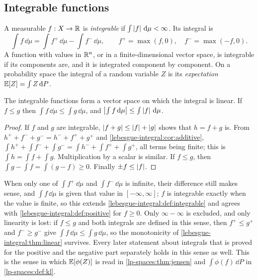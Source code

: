 \begin{notechapter}
\section{Integrable functions}\label{lebesgue-integral:sec:integrable}

\begin{definition}\label{lebesgue-integral:def:integrable}
A measurable $f:X\to\mathbb{R}$ is \emph{integrable} if
$\int\left|f\right|\,\mathrm{d}\mu < \infty$. Its integral is
\[
  \int f\,\dd\mu = \int f^+\,\dd\mu - \int f^-\,\dd\mu , \qquad
  f^+ = \max(f, 0),\quad f^- = \max(-f, 0) .
\]
A function with values in $\mathbb{R}^n$, or in a finite-dimensional vector
space, is integrable if its components are, and it is integrated
component by component. On a probability space the integral of a random
variable $Z$ is its \emph{expectation} $\mathbb{E}[Z] = \int Z\,\mathrm{d} P$.
\end{definition}

\begin{theorem}\label{lebesgue-integral:thm:linear}
The integrable functions form a vector space on which the integral is
linear. If $f\leq g$ then $\int f\,\dd\mu\leq\int g\,\dd\mu$, and
$\left|\int f\,\mathrm{d}\mu\right|\leq\int\left|f\right|\,\mathrm{d}\mu$.
\end{theorem}

\begin{proof}
If $f$ and $g$ are integrable, $\left|f + g\right|\leq\left|f\right| + \left|g\right|$ shows
that $h = f + g$ is. From
$h^+ + f^- + g^- = h^- + f^+ + g^+$ and
\cref{lebesgue-integral:cor:additive},
$\int h^+ + \int f^- + \int g^- = \int h^- + \int f^+ + \int g^+$, all
terms being finite; this is $\int h = \int f + \int g$. Multiplication
by a scalar is similar. If $f\leq g$, then
$\int g - \int f = \int(g - f)\geq0$. Finally
$\pm f\leq\left|f\right|$.
\end{proof}

\begin{remark}
\label{lebesgue-integral:rem:extended}
When only one of $\int f^+\,\dd\mu$ and $\int f^-\,\dd\mu$ is
infinite, their difference still makes sense, and
$\int f\,\dd\mu$ is given that value in $[-\infty, \infty]$; $f$ is
integrable exactly when the value is finite, so this extends
\cref{lebesgue-integral:def:integrable} and agrees with
\cref{lebesgue-integral:def:positive} for $f\geq0$. Only
$\infty - \infty$ is excluded, and only linearity is lost: if
$f\leq g$ and both integrals are defined in this sense, then
$f^+\leq g^+$ and $f^-\geq g^-$ give
$\int f\,\dd\mu\leq\int g\,\dd\mu$, so the monotonicity of
\cref{lebesgue-integral:thm:linear} survives. Every later statement
about integrals that is proved for the positive and the negative part
separately holds in this sense as well. This is the sense in
which $\mathbb{E}[\phi(Z)]$ is read in \cref{lp-spaces:thm:jensen} and
$\int\phi(f)\,\dd P$ in \cref{lp-spaces:def:kl}.
\end{remark}


\end{notechapter}

